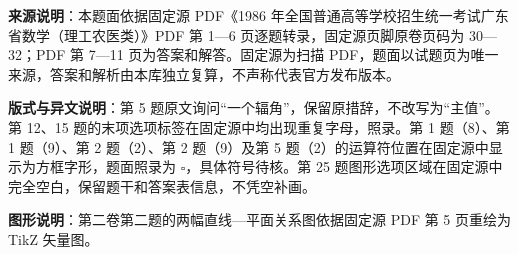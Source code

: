 


\begin{gktip}
\textbf{来源说明}：本题面依据固定源 PDF《1986 年全国普通高等学校招生统一考试广东省数学（理工农医类）》PDF 第 1—6 页逐题转录，固定源页脚原卷页码为 30—32；PDF 第 7—11 页为答案和解答。固定源为扫描 PDF，题面以试题页为唯一来源，答案和解析由本库独立复算，不声称代表官方发布版本。

\textbf{版式与异文说明}：第 5 题原文询问“一个辐角”，保留原措辞，不改写为“主值”。第 12、15 题的末项选项标签在固定源中均出现重复字母，照录。第 1 题（8）、第 1 题（9）、第 2 题（2）、第 2 题（9）及第 5 题（2）的运算符位置在固定源中显示为方框字形，题面照录为 $\square$，具体符号待核。第 25 题图形选项区域在固定源中完全空白，保留题干和答案表信息，不凭空补画。

\textbf{图形说明}：第二卷第二题的两幅直线—平面关系图依据固定源 PDF 第 5 页重绘为 TikZ 矢量图。
\end{gktip}

